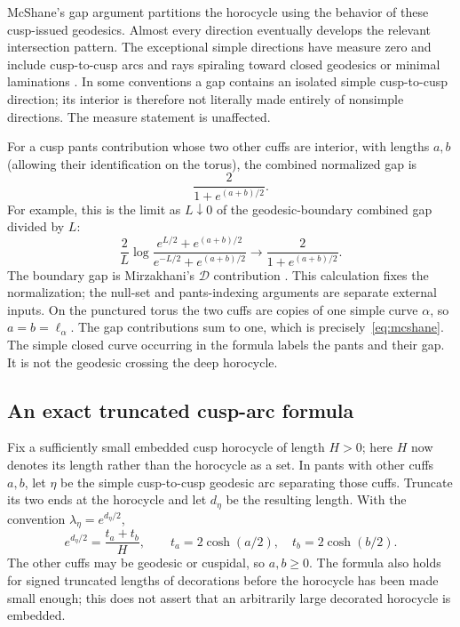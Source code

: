 McShane's gap argument partitions the horocycle using the behavior of
these cusp-issued geodesics. Almost every direction eventually develops
the relevant intersection pattern. The exceptional simple directions
have measure zero and include cusp-to-cusp arcs and rays spiraling toward
closed geodesics or minimal laminations
\cite{McShane}\cite[Theorem 3 and the following measure discussion,
pp.~3--4]{McShanePants}.
In some conventions a gap contains an isolated simple cusp-to-cusp
direction; its interior is therefore not literally made entirely of
nonsimple directions. The measure statement is unaffected.

For a cusp pants contribution whose two other cuffs are interior, with
lengths $a,b$ (allowing their identification on the torus), the combined
normalized gap is
\begin{equation}
 \frac{2}{1+e^{(a+b)/2}}.
 \label{eq:cuspgap}
\end{equation}
For example, this is the limit as $L\downarrow0$ of the geodesic-boundary
combined gap divided by $L$:
\[
 \frac{2}{L}\log
 \frac{e^{L/2}+e^{(a+b)/2}}{e^{-L/2}+e^{(a+b)/2}}
 \longrightarrow \frac{2}{1+e^{(a+b)/2}}.
\]
The boundary gap is Mirzakhani's $\mathcal D$ contribution
\cite[Lemma 3.1, equation (3.1), and Theorem 4.2]{MirzVolumes}. This calculation fixes the
normalization; the null-set and pants-indexing arguments are separate
external inputs.
On the punctured torus the two cuffs are copies of one simple curve
$\alpha$, so $a=b=\ell_\alpha$. The gap contributions sum to one,
which is precisely~\eqref{eq:mcshane}. The simple closed curve occurring
in the formula labels the pants and their gap. It is not the geodesic
crossing the deep horocycle.

\subsection{An exact truncated cusp-arc formula}

Fix a sufficiently small embedded cusp horocycle of length $H>0$; here $H$ now
denotes its length rather than the horocycle as a set. In pants with other
cuffs $a,b$, let $\eta$ be the simple cusp-to-cusp geodesic arc separating
those cuffs. Truncate its two ends at the horocycle and let $d_\eta$ be
the resulting length. With the convention $\lambda_\eta=e^{d_\eta/2}$,
\begin{equation}
 \boxed{e^{d_\eta/2}=\frac{t_a+t_b}{H},
        \qquad t_a=2\cosh(a/2),\quad t_b=2\cosh(b/2).}
 \label{eq:cusplambda}
\end{equation}
The other cuffs may be geodesic or cuspidal, so $a,b\geq0$.
The formula also holds for signed truncated lengths of decorations before
the horocycle has been made small enough; this does not assert that an
arbitrarily large decorated horocycle is embedded.

